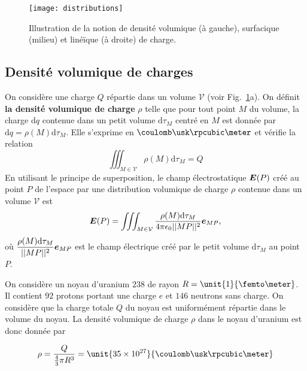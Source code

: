 \begin{figure}
	\centering
	\texttt{[image: distributions]}
	\caption{Illustration de la notion de densité volumique (à gauche),
		 surfacique (milieu) et linéïque (à droite) de charge.}%
	\label{fig:distributions}
\end{figure}

\subsection{Densité volumique de charges}
	On considère une charge $Q$ répartie dans un volume $\mathcal{V}$
	(voir Fig.~\ref{fig:distributions}a). 
	On définit \textbf{
	la densité volumique de charge} $\rho$ 
	telle que pour tout point $M$ du volume,
	la charge $\mathrm{d}q$ contenue dans un petit volume $\mathrm{d}\tau_M$ centré 
	en $M$ est donnée par $\mathrm{d}q = \rho(M) \mathrm{d}\tau_M$.
	Elle s'exprime en $\coulomb \usk \rpcubic \meter$ et vérifie la relation
\begin{equation*}
	\iiint_{M \in \mathcal{V}} \rho(M) \mathrm{d}\tau_M = Q
\end{equation*}
En utilisant le principe de superposition, le champ électrostatique $\vece(P)$
créé au point $P$ de l'espace par une distribution volumique de charge $\rho$
contenue dans un volume $\mathcal{V}$ est
\begin{equation}
	\vece(P) =  \iiint_{M \in \mathcal{V}} 
	\dfrac{\rho(M) \mathrm{d}\tau_M}{4 \pi \epsilon_0 ||MP||^2}\mitbf{e}_{MP},
\end{equation}
où $\dfrac{\rho(M) \mathrm{d}\tau_M}{||MP||^2}\mitbf{e}_{MP}$ est le champ 
électrique créé par le petit volume $\mathrm{d}\tau_M$ au point $P$.

\begin{exemple}
	On considère un noyau d'uranium $238$ de rayon $R = \unit{1}{\femto \meter}$.
	Il contient $92$ protons portant une charge $e$ et $146$ neutrons sans charge.
	On considère que la charge totale $Q$ du noyau est uniformément répartie
	dans le volume du noyau. La densité volumique de charge $\rho$ dans 
	le noyau d'uranium est donc donnée par

	\begin{equation*}
		\rho = \dfrac{Q}{\frac{4}{3}\pi R^3} = 
		\unit{35 \times 10^{27}}{\coulomb \usk \rpcubic \meter}
	\end{equation*}
\end{exemple}

